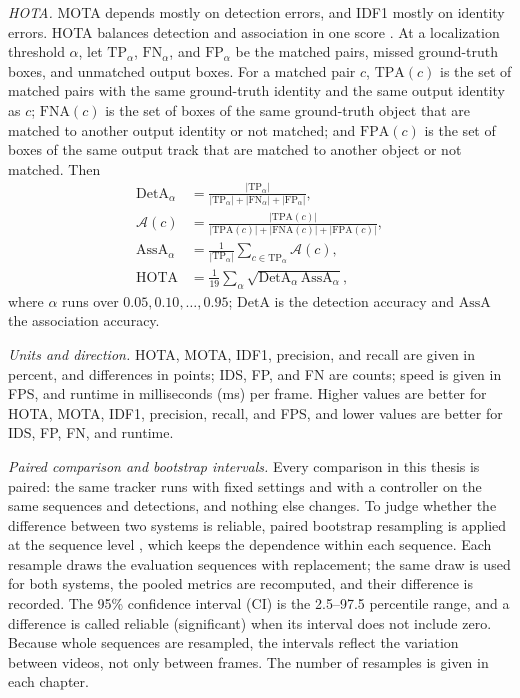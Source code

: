 \emph{HOTA.} MOTA depends mostly on detection errors, and IDF1 mostly on identity errors. HOTA balances detection and association in one score \cite{luiten2021hota}. At a localization threshold $\alpha$, let $\mathrm{TP}_\alpha$, $\mathrm{FN}_\alpha$, and $\mathrm{FP}_\alpha$ be the matched pairs, missed ground-truth boxes, and unmatched output boxes. For a matched pair $c$, $\mathrm{TPA}(c)$ is the set of matched pairs with the same ground-truth identity and the same output identity as $c$; $\mathrm{FNA}(c)$ is the set of boxes of the same ground-truth object that are matched to another output identity or not matched; and $\mathrm{FPA}(c)$ is the set of boxes of the same output track that are matched to another object or not matched. Then
\begin{align}
\mathrm{DetA}_\alpha&=\frac{|\mathrm{TP}_\alpha|}{|\mathrm{TP}_\alpha|+|\mathrm{FN}_\alpha|+|\mathrm{FP}_\alpha|},\label{eq:bg-deta}\\
\mathcal{A}(c)&=\frac{|\mathrm{TPA}(c)|}{|\mathrm{TPA}(c)|+|\mathrm{FNA}(c)|+|\mathrm{FPA}(c)|},\label{eq:bg-ac}\\
\mathrm{AssA}_\alpha&=\frac{1}{|\mathrm{TP}_\alpha|}\sum_{c\in\mathrm{TP}_\alpha}\mathcal{A}(c),\label{eq:bg-assa}\\
\mathrm{HOTA}&=\frac{1}{19}\sum_{\alpha}\sqrt{\mathrm{DetA}_\alpha\,\mathrm{AssA}_\alpha},\label{eq:bg-hota}
\end{align}
where $\alpha$ runs over $0.05, 0.10, \dots, 0.95$; $\mathrm{DetA}$ is the detection accuracy and $\mathrm{AssA}$ the association accuracy.

\emph{Units and direction.} HOTA, MOTA, IDF1, precision, and recall are given in percent, and differences in points; IDS, FP, and FN are counts; speed is given in FPS, and runtime in milliseconds (ms) per frame. Higher values are better for HOTA, MOTA, IDF1, precision, recall, and FPS, and lower values are better for IDS, FP, FN, and runtime.

\emph{Paired comparison and bootstrap intervals.} Every comparison in this thesis is paired: the same tracker runs with fixed settings and with a controller on the same sequences and detections, and nothing else changes. To judge whether the difference between two systems is reliable, paired bootstrap resampling is applied at the sequence level \cite{efron2016casi}, which keeps the dependence within each sequence. Each resample draws the evaluation sequences with replacement; the same draw is used for both systems, the pooled metrics are recomputed, and their difference is recorded. The 95\% confidence interval (CI) is the 2.5--97.5 percentile range, and a difference is called reliable (significant) when its interval does not include zero. Because whole sequences are resampled, the intervals reflect the variation between videos, not only between frames. The number of resamples is given in each chapter.

